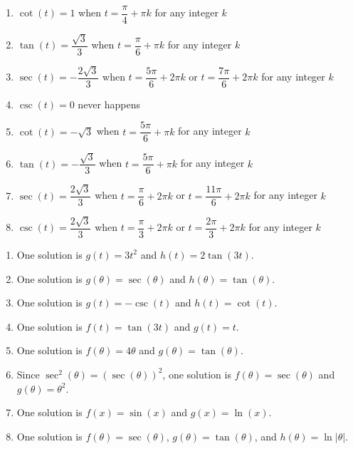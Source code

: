 \begin{enumerate}

\setcounter{enumi}{\value{HW}}

\item $\cot(t) = 1$ when $t = \dfrac{\pi}{4} + \pi k$ for any integer $k$
\item  $\tan(t) = \dfrac{\sqrt{3}}{3}$ when $t = \dfrac{\pi}{6} + \pi k$ for any integer $k$
\item $\sec(t) = -\dfrac{2\sqrt{3}}{3}$ when $t = \dfrac{5\pi}{6} + 2\pi k$ or $t = \dfrac{7\pi}{6} + 2\pi k$ for any integer $k$
\item $\csc(t) = 0$ never happens 
\item $\cot(t) = -\sqrt{3}$ when $t = \dfrac{5\pi}{6} + \pi k$ for any integer $k$
\item $\tan(t) = -\dfrac{\sqrt{3}}{3}$ when $t = \dfrac{5\pi}{6} + \pi k$ for any integer $k$
\item $\sec(t) = \dfrac{2\sqrt{3}}{3}$ when $t = \dfrac{\pi}{6} + 2\pi k$ or $t = \dfrac{11\pi}{6} + 2\pi k$ for any integer $k$
\item $\csc(t) = \dfrac{2\sqrt{3}}{3}$ when $t = \dfrac{\pi}{3} + 2\pi k$ or $t = \dfrac{2\pi}{3} + 2\pi k$ for any integer $k$

\setcounter{HW}{\value{enumi}}
\end{enumerate}

\begin{enumerate}
\setcounter{enumi}{\value{HW}}

\item  One solution is $g(t) = 3t^2$ and $h(t) = 2\tan(3t)$.

\item  One solution is $g(\theta) = \sec(\theta)$ and $h(\theta) = \tan(\theta)$.

\item  One solution is $g(t) = -\csc(t)$ and $h(t) = \cot(t)$.

\item  One solution is $f(t) = \tan(3t)$ and $g(t) = t$.

\item  One solution is $f(\theta) = 4 \theta$ and $g(\theta) = \tan(\theta)$.

\item  Since $\sec^{2}(\theta) = (\sec(\theta))^2$, one solution is $f(\theta) = \sec(\theta)$ and $g(\theta) = \theta^2$.

\item  One solution is $f(x) = \sin(x)$ and $g(x) = \ln(x)$.

\item  One solution is $f(\theta) = \sec(\theta)$, $g(\theta) = \tan(\theta)$, and $h(\theta) = \ln| \theta|$.

\setcounter{HW}{\value{enumi}}
\end{enumerate}

